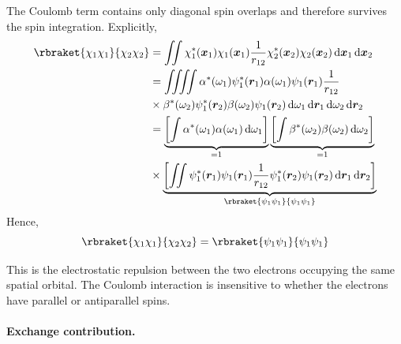 \documentclass[11pt,a4paper,titlepage]{article}
\numberwithin{equation}{section}
\newcommand{\br}{\boldsymbol{r}}
\newcommand{\bx}{\boldsymbol{x}}
\begin{document}
The Coulomb term contains only diagonal spin overlaps and therefore survives
the spin integration. Explicitly,
\begin{equation}
\begin{split}
  \rbraket{\chi_1\chi_1}{\chi_2\chi_2}
  &=
  \iint
  \chi_1^*(\bx_1)
  \chi_1(\bx_1)
  \frac{1}{r_{12}}
  \chi_2^*(\bx_2)
  \chi_2(\bx_2)
  \dd{\bx_1}\dd{\bx_2}
  \\
  &=
  \iiiint
  \alpha^*(\omega_1)
  \psi_1^*(\br_1)
  \alpha(\omega_1)
  \psi_1(\br_1)
  \frac{1}{r_{12}}
  \\
  &\times
  \beta^*(\omega_2)
  \psi_1^*(\br_2)
  \beta(\omega_2)
  \psi_1(\br_2)
  \dd{\omega_1}\dd{\br_1}
  \dd{\omega_2}\dd{\br_2}
  \\
  &=
  \underbrace{
  \qty[
    \int
    \alpha^*(\omega_1)\alpha(\omega_1)
    \dd{\omega_1}
  ]}_{=1}
  \underbrace{
  \qty[
    \int
    \beta^*(\omega_2)\beta(\omega_2)
    \dd{\omega_2}
  ]}_{=1}
  \\
  &\times
  \underbrace{
  \qty[
    \iint
    \psi_1^*(\br_1)\psi_1(\br_1)
    \frac{1}{r_{12}}
    \psi_1^*(\br_2)\psi_1(\br_2)
    \dd{\br_1}\dd{\br_2}
  ]}_{\rbraket{\psi_1\psi_1}{\psi_1\psi_1}}
\end{split}
\end{equation}
Hence,
\begin{equation}
  \rbraket{\chi_1\chi_1}{\chi_2\chi_2}
  =
  \rbraket{\psi_1\psi_1}{\psi_1\psi_1}
\end{equation}

This is the electrostatic repulsion between the two electrons occupying the
same spatial orbital. The Coulomb interaction is insensitive to whether the
electrons have parallel or antiparallel spins.

\paragraph{Exchange contribution.}
\end{document}
